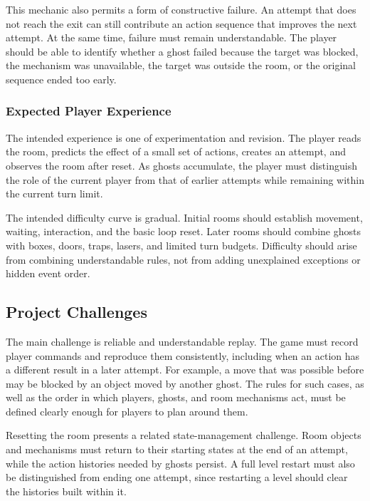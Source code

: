 This mechanic also permits a form of constructive failure. An attempt that does not reach the exit can still contribute an action sequence that improves the next attempt. At the same time, failure must remain understandable. The player should be able to identify whether a ghost failed because the target was blocked, the mechanism was unavailable, the target was outside the room, or the original sequence ended too early.

\subsubsection{Expected Player Experience}

The intended experience is one of experimentation and revision. The player reads the room, predicts the effect of a small set of actions, creates an attempt, and observes the room after reset. As ghosts accumulate, the player must distinguish the role of the current player from that of earlier attempts while remaining within the current turn limit.

The intended difficulty curve is gradual. Initial rooms should establish movement, waiting, interaction, and the basic loop reset. Later rooms should combine ghosts with boxes, doors, traps, lasers, and limited turn budgets. Difficulty should arise from combining understandable rules, not from adding unexplained exceptions or hidden event order.

\subsection{Project Challenges}

The main challenge is reliable and understandable replay. The game must record player commands and reproduce them consistently, including when an action has a different result in a later attempt. For example, a move that was possible before may be blocked by an object moved by another ghost. The rules for such cases, as well as the order in which players, ghosts, and room mechanisms act, must be defined clearly enough for players to plan around them.

Resetting the room presents a related state-management challenge. Room objects and mechanisms must return to their starting states at the end of an attempt, while the action histories needed by ghosts persist. A full level restart must also be distinguished from ending one attempt, since restarting a level should clear the histories built within it.

